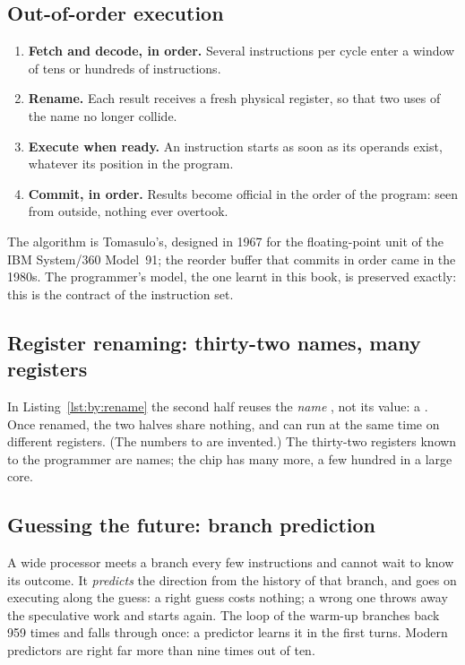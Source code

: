 \subsection{Out-of-order execution}

\begin{enumerate}
\item \textbf{Fetch and decode, in order.} Several instructions per cycle enter
  a window of tens or hundreds of instructions.
\item \textbf{Rename.} Each result receives a fresh physical register, so that
  two uses of the name  no longer collide.
\item \textbf{Execute when ready.} An instruction starts as soon as its
  operands exist, whatever its position in the program.
\item \textbf{Commit, in order.} Results become official in the order of the
  program: seen from outside, nothing ever overtook.
\end{enumerate}

The algorithm is Tomasulo's, designed in 1967 for the floating-point unit of
the IBM System/360 Model~91; the reorder buffer that commits in order came in
the 1980s. The programmer's model, the one learnt in this book, is preserved
exactly: this is the contract of the instruction set.

\subsection{Register renaming: thirty-two names, many registers}


In Listing~\ref{lst:by:rename} the second half reuses the \emph{name}
, not its value: a . Once renamed, the two
halves share nothing, and can run at the same time on different registers.
(The numbers  to  are invented.) The thirty-two registers
known to the programmer are names; the chip has many more, a few hundred in a
large core.

\subsection{Guessing the future: branch prediction}

A wide processor meets a branch every few instructions and cannot wait to
know its outcome. It \emph{predicts} the direction from the history of that
branch, and goes on executing along the guess: a right guess costs nothing; a
wrong one throws away the speculative work and starts again. The loop of the
warm-up branches back 959 times and falls through once: a predictor learns it
in the first turns. Modern predictors are right far more than nine times out
of ten.

